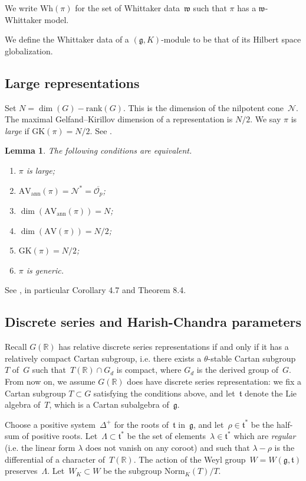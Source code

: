 \documentclass[10pt,leqno]{article}
\newtheorem{lemma}[equation]{Lemma}
\renewcommand{\O}{\mathcal O}
\newcommand{\R}{\mathbb R}
\newcommand{\N}{\mathcal N}
\renewcommand{\t}{\mathfrak t}
\newcommand{\g}{\mathfrak g}
\newcommand{\w}{\mathfrak w}
\newcommand{\AV}{\mathrm{AV}}
\newcommand{\Wh}{\mathrm{Wh}}
\newcommand{\AVann}{\mathrm{AV}_{\mathrm{ann}}}
\newcommand{\GK}{\mathrm{GK}}
\newcommand{\Op}{\O_p}
\begin{document}
We write $\Wh(\pi)$ for the set of Whittaker data~$\w$ such that $\pi$ has a $\w$-Whittaker model.

We define the Whittaker data  of a $(\g,K)$-module to be that of its 
Hilbert space globalization.


\subsection{Large representations} Set $N=\dim(G)-\mathrm{rank}(G)$. This is the dimension of the nilpotent cone~$\N$. The maximal Gelfand--Kirillov dimension of a representation is $N/2$.
We say $\pi$ is {\it large} if $\GK(\pi)=N/2$. See \cite[Section~6]{vogan-gelfand-kirillov}. 


\begin{lemma}
  \label{l:large}
  The following conditions are equivalent.
  \begin{enumerate}
    \item $\pi$ is large;
\item $\AVann(\pi)=\N^*=\overline{\Op}$;
\item $\dim(\AVann(\pi))=N$;
  \item $\dim(\AV(\pi))=N/2$;
  \item $\GK(\pi)=N/2$;
    \item $\pi$ is generic.

\end{enumerate}
\end{lemma}
See \cite{vogan_bowdoin}, in particular Corollary 4.7 and Theorem 8.4.



\subsection{Discrete series and Harish-Chandra parameters} \label{sec:discrete_series}

Recall $G(\R)$ has relative discrete series representations if and only if it has a relatively compact Cartan subgroup, i.e. there exists a $\theta$-stable Cartan subgroup~$T$ of~$G$  such that~$T(\R) \cap G_d$ is  compact, where $G_d$ is the derived group of~$G$. From now on, we assume $G(\R)$ does have discrete series representation: we fix  a Cartan subgroup $T \subset G$ satisfying the conditions above, and let~$\mathfrak{t}$ denote the Lie algebra of~$T$, which is a Cartan subalgebra of~$\g$. 

Choose a  positive system~$\Delta^+$  for the roots of~$\t$ in~$\g$, and let~$\rho \in \mathfrak{t}^\ast$ be the half-sum of positive roots. Let~$\Lambda \subset \mathfrak{t}^\ast$ be the set of elements~$\lambda \in \mathfrak{t}^\ast$ which are \emph{regular} (i.e. the linear form $\lambda$ does not vanish on any coroot) and such that $\lambda-\rho$  is the differential of a character of~$T(\R)$. The action of the Weyl group~$W=W(\g, \t)$ preserves~$\Lambda$. Let~$W_K\subset W$ be the subgroup $\mathrm{Norm}_K(T)/T$. 
\end{document}
